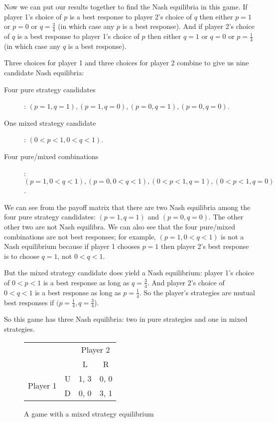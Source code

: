 \begin{CALCULUS}
\begin{enumerate}
{Now we can put our results together to find the Nash equilibria in this game. If player 1's choice of $p$ is a best response to player 2's choice of $q$ then either $p=1$ or $p=0$ or $q=\frac{3}{4}$ (in which case any $p$ is a best response). And if player 2's choice of $q$ is a best response to player 1's choice of $p$ then either $q=1$ or $q=0$ or $p=\frac{1}{4}$ (in which case any $q$ is a best response).

Three choices for player 1 and three choices for player 2 combine to give us nine candidate Nash equilibria:
\begin{description}
\item[Four pure strategy candidates]: $(p=1,q=1), (p=1, q=0), (p=0, q=1), (p=0, q=0)$. \item[One mixed strategy candidate]: $(0<p<1, 0<q<1)$. \item[Four pure/mixed combinations]: $(p=1, 0<q<1), (p=0, 0<q<1), (0<p<1,q=1), (0<p<1, q=0)$.
\end{description}
We can see from the payoff matrix that there are two Nash equilibria among the four pure strategy candidates: $(p=1,q=1)$ and $(p=0,q=0)$. The other other two are not Nash equilibra. We can also see that the four pure/mixed combinations are not best responses; for example, $(p=1,0<q<1)$ is not a Nash equilibrium because if player 1 chooses $p=1$ then player 2's best response is to choose $q=1$, not $0<q<1$.

But the mixed strategy candidate does yield a Nash equilibrium: player 1's choice of $0<p<1$ is a best response as long as $q=\frac{3}{4}$. And player 2's choice of $0<q<1$ is a best response as long as $p=\frac{1}{4}$. So the player's strategies are mutual best responses if $(p=\frac{1}{4}, q=\frac{3}{4}$).

So this game has three Nash equilibria: two in pure strategies and one in mixed strategies.}

\begin{figure}[h]
\begin{center}
\begin{tabular}{crcc}
& & \multicolumn{2}{c}{Player 2} \\ [.15cm] & & L & R \\
\cline{3-4} \multirow{2}{1.5cm}{Player 1} & U &
\multicolumn{1}{|c|}{1, 3} & \multicolumn{1}{c|}{0, 0} \\
\cline{3-4}
                   & D & \multicolumn{1}{|c|}{0, 0} & \multicolumn{1}{c|}{3, 1} \\ \cline{3-4}
\end{tabular}
\end{center}
\caption{A game with a mixed strategy equilibrium}
\label{fig:mixedex1}
\end{figure}






\end{enumerate}
\end{CALCULUS}
